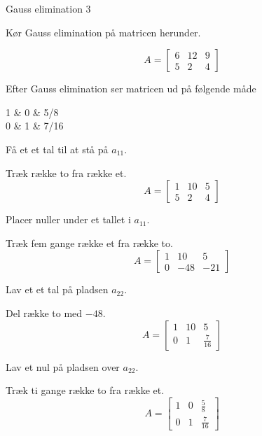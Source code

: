 \documentclass{article}
\begin{document}
\begin{exercise}{Gauss elimination 3}
	
	
	Kør Gauss elimination på matricen herunder.
	
	\[
	A = \left[\begin{array}{rr|r}
	6 & 12 & 9 \\ 
	5 & 2 & 4
	\end{array} \right]
	\]
	
	Efter Gauss elimination ser matricen ud på følgende måde
	\begin{answermatrix}
		1 & 0 & 5/8 \\
		0 & 1 & 7/16
	\end{answermatrix}
	
	\hint
	Få et et tal til at stå på $a_{11}$.
	
	\hint
	Træk række to fra række et.
	\[
	A = \left[\begin{array}{rr|r}
	1 & 10 & 5 \\ 
	5 & 2 & 4
	\end{array} \right]
	\]
	
	\hint
	Placer nuller under et tallet i $a_{11}$.
	
	\hint
	Træk fem gange række et fra række to.
	\[
	A = \left[\begin{array}{rr|r}
	1 & 10 & 5 \\ 
	0 & -48 & -21
	\end{array} \right]
	\]
	
	\hint
	Lav et et tal på pladsen $a_{22}$.
	
	\hint
	Del række to med $-48$.
	\[
	A = \left[\begin{array}{rr|r}
	1 & 10 & 5 \\ 
	0 & 1 & \frac{7}{16}
	\end{array} \right]
	\]
	
	
	\hint
	Lav et nul på pladsen over $a_{22}$.
	
	\hint
	Træk ti gange række to fra række et.
	\[
	A = \left[\begin{array}{rr|r}
	1 & 0 & \frac{5}{8} \\ 
	0 & 1 & \frac{7}{16}
	\end{array} \right]
	\]
	
	
\end{exercise}

\newpage
\end{document}
